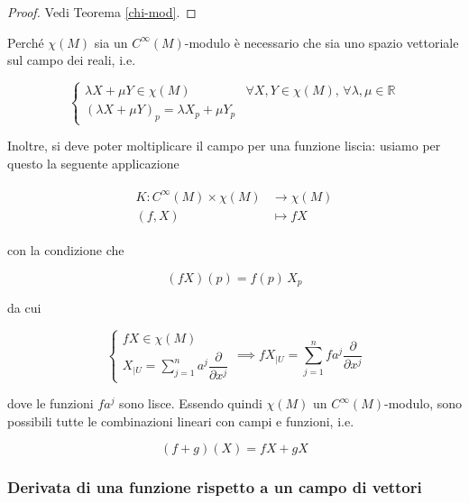\begin{proof}
	Vedi Teorema \ref{chi-mod}.
\end{proof}

Perché $ \chi(M) $ sia un $ C^{\infty}(M) $-modulo è necessario che sia uno spazio vettoriale sul campo dei reali, i.e.

\begin{equation}
	\begin{cases}
		\lambda X + \mu Y \in \chi(M) & \forall X,Y \in \chi(M), \, \forall \lambda,\mu \in \mathbb{R}\\
		(\lambda X + \mu Y)_{p} = \lambda X_{p} + \mu Y_{p}
	\end{cases}
\end{equation}

Inoltre, si deve poter moltiplicare il campo per una funzione liscia: usiamo per questo la seguente applicazione

\begin{align}
	\begin{split}
		K : C^{\infty}(M) \times \chi(M) &\to \chi(M)\\
		(f,X) &\mapsto f X
	\end{split}
\end{align}

con la condizione che

\begin{equation}
	(f X)(p) = f(p) \, X_{p}
\end{equation}

da cui

\begin{equation}
	\begin{cases}
		f X \in \chi(M)\\
		X_{|U} = \sum_{j=1}^{n} a^{j} \dfrac{\partial}{\partial x^{j}}
	\end{cases}%
	\implies%
	f X_{|U} = \sum_{j=1}^{n} f a^{j} \dfrac{\partial}{\partial x^{j}}
\end{equation}

dove le funzioni $ f a^{j} $ sono lisce. Essendo quindi $ \chi(M) $ un $ C^{\infty}(M) $-modulo, sono possibili tutte le combinazioni lineari con campi e funzioni, i.e.

\begin{equation}
	(f+g)(X) = f X + g X
\end{equation}

\subsubsection{Derivata di una funzione rispetto a un campo di vettori}


